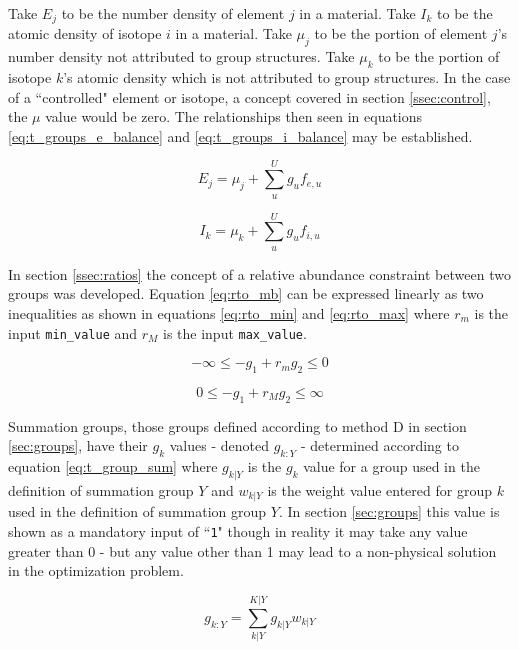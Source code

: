 Take $E_{j}$ to be the number density of element $j$ in a material. Take
$I_{k}$ to be the atomic density of isotope $i$ in a material. Take
$\mu_{j}$ to be the portion of element $j$'s number density not attributed to
group structures. Take $\mu_{k}$ to be the portion of isotope $k$'s atomic
density which is not attributed to group structures. In the case of a
``controlled" element or isotope, a concept covered in section 
\ref{ssec:control}, the $\mu$ value would be zero. The relationships then
seen in equations \ref{eq:t_groups_e_balance} and \ref{eq:t_groups_i_balance}
may be established.

\begin{equation}\label{eq:t_groups_e_balance}
E_{j} = \mu_{j} + \sum_{u}^{U} g_{u}f_{e,u} 
\end{equation}

\begin{equation}\label{eq:t_groups_i_balance}
I_{k} = \mu_{k} + \sum_{u}^{U} g_{u}f_{i,u} 
\end{equation}

In section \ref{ssec:ratios} the concept of a relative abundance constraint
between two groups was developed. Equation \ref{eq:rto_mb} can be 
expressed linearly as two inequalities as
shown in equations \ref{eq:rto_min} and \ref{eq:rto_max} where $r_{m}$ is the
input \texttt{min\_value} and $r_{M}$ is the input \texttt{max\_value}.

\begin{equation}
\label{eq:rto_min}
-\infty \leq -g_{1} + r_{m}g_{2} \leq 0
\end{equation}

\begin{equation}
\label{eq:rto_max}
0 \leq -g_{1} + r_{M}g_{2} \leq \infty
\end{equation}

Summation groups, those groups defined according to method D in section 
\ref{sec:groups}, have their $g_{k}$ values - denoted $g_{k:Y}$ - determined 
according to equation \ref{eq:t_group_sum} where $g_{k|Y}$ is the $g_{k}$ 
value for a group used in the definition of summation group $Y$ and $w_{k|Y}$
is the weight value entered for group $k$ used in the definition of summation
group $Y$. In section \ref{sec:groups} this value is shown as a mandatory input
of ``\texttt{1}" though in reality it may take any value greater than 0 - but
any value other than 1 may lead to a non-physical solution in the optimization
problem. 

\begin{equation}\label{eq:t_group_sum}
g_{k:Y} = \sum_{k|Y}^{K|Y} g_{k|Y} w_{k|Y}
\end{equation}

